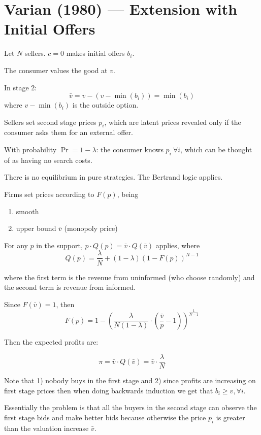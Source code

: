 \documentclass[12pt]{article}
\theoremstyle{plain}
\theoremstyle{plain}
\begin{document}
\section*{Varian (1980) --- Extension with Initial Offers}

Let $N$ sellers. $c=0$ makes initial offers $b_i$.

The consumer values the good at $v$.

In stage 2:
\[
\bar{v} = v - (v - \min(b_i)) = \min(b_i)
\]
where $v - \min(b_i)$ is the outside option. 

Sellers set second stage prices $p_i$, which are latent prices revealed only if the consumer asks them for an external offer.

With probability $\Pr = 1- \lambda$: the consumer knows $p_i\ \forall i$, which can be thought of as having no search costs.

There is no equilibrium in pure strategies. The Bertrand logic applies.


 Firms set prices according to $F(p)$, being
\begin{enumerate}
    \item smooth
    \item upper bound $\bar{v} $ (monopoly price)
\end{enumerate}

For any $p$ in the support, $p \cdot Q(p) = \bar{v} \cdot Q(\bar{v})$ applies, where
\[
Q(p) = \frac{\lambda}{N} + (1 - \lambda) \left(1 - F(p)\right)^{N-1}
\]

where the first term is the revenue from uninformed (who choose randomly) and the second term is revenue from informed. 


Since $F(\bar{v}) = 1$, then
\[
F(p) = 1 - \left( \frac{ \lambda}{N (1- \lambda)} \cdot \left( \frac{\bar{v}}{p} - 1 \right) \right)^{\frac{1}{N-1}}
\]

Then the expected profits are: 

\[
\pi =  \bar{v} \cdot Q(\bar{v})=  \bar{v} \cdot \frac{\lambda}{N}
\]

Note that 1) nobody buys in the first stage and 2) since profits are increasing on first stage prices then when doing backwards induction we get that $b_i \geq v, \forall i$. 

Essentially the problem is that all the buyers in the second stage can observe the first stage bids and make better bids because otherwise the price $p_i$ is greater than the valuation increase $\bar{v}$. 
\end{document}
